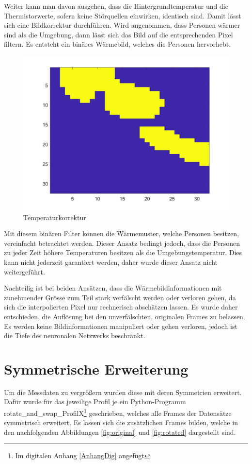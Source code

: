 Weiter kann man davon ausgehen, dass die Hintergrundtemperatur und die Thermistorwerte, sofern keine Störquellen einwirken, identisch sind. Damit lässt sich eine Bildkorrektur durchführen. Wird angenommen, dass Personen wärmer sind als die Umgebung, dann lässt sich das Bild auf die entsprechenden Pixel filtern. Es entsteht ein binäres Wärmebild, welches die Personen hervorhebt. 

\begin{figure}[H]
	\centering
	\includegraphics[width=0.5\linewidth]{fig/interpol_3}
    \caption[Temperaturkorrektur]{Temperaturkorrektur}
   \label{fig:interpol3}
\end{figure}

Mit diesem binären Filter können die Wärmemuster, welche Personen besitzen, vereinfacht betrachtet werden. Dieser Ansatz bedingt jedoch, dass die Personen zu jeder Zeit höhere Temperaturen besitzen als die Umgebungstemperatur. Dies kann nicht jederzeit garantiert werden, daher wurde dieser Ansatz nicht weitergeführt.

Nachteilig ist bei beiden Ansätzen, dass die Wärmebildinformationen mit zunehmender Grösse zum Teil stark verfälscht werden oder verloren gehen, da sich die interpolierten Pixel nur rechnerisch abschätzen lassen. Es wurde daher entschieden, die Auflösung bei den unverfälschten, originalen Frames zu belassen. Es werden keine Bildinformationen manipuliert oder gehen verloren, jedoch ist die Tiefe des neuronalen Netzwerks beschränkt.

\section{Symmetrische Erweiterung}
\label{sec:Symmetrische Erweiterung}

Um die Messdaten zu vergrößern wurden diese mit deren Symmetrien erweitert. Dafür wurde für das jeweilige Profil je ein Python-Programm rotate\_and\_swap\_ProfilX\footnote[24]{Im digitalen Anhang \ref{AnhangDig} angefügt}  geschrieben, welches alle Frames der Datensätze symmetrisch erweitert.  Es lassen sich die zusätzlichen Frames bilden, welche in den nachfolgenden Abbildungen \ref{fig:original} und \ref{fig:rotated} dargestellt sind.

